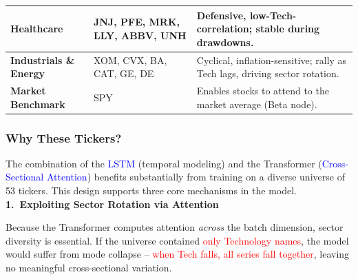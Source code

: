\documentclass[twoside,final]{hcmut-report}
\begin{document}
\begin{table}[H]
\begin{tabular}{p{3cm}|p{6cm}|p{7cm}}
    \textbf{Healthcare}
                                           & \parbox[t]{6cm}{\raggedright
      JNJ, PFE, MRK, LLY, ABBV, UNH
    }
                                           & \parbox[t]{7cm}{\raggedright
      Defensive, low-Tech-correlation; stable during drawdowns.
    }                                                                                                                                  \\
    \hline

    \textbf{Industrials \& Energy}
                                           & \parbox[t]{6cm}{\raggedright
      XOM, CVX, BA, CAT, GE, DE
    }
                                           & \parbox[t]{7cm}{\raggedright
      Cyclical, inflation-sensitive; rally as Tech lags, driving sector rotation.
    }                                                                                                                                  \\
    \hline

    \textbf{Market Benchmark}
                                           & \parbox[t]{6cm}{\raggedright
      SPY
    }
                                           & \parbox[t]{7cm}{\raggedright
      Enables stocks to attend to the market average (Beta node).
    }                                                                                                                                  \\
  \end{tabular}
\end{table}


\subsubsection*{Why These Tickers?}

The combination of the \textcolor{blue}{LSTM} (temporal modeling) and the Transformer (\textcolor{blue}{Cross-Sectional Attention}) benefits substantially from training on a diverse universe of 53 tickers. This design supports three core mechanisms in the model.\\

\textbf{1.~Exploiting Sector Rotation via Attention}

Because the Transformer computes attention \emph{across} the batch dimension, sector diversity is essential. If the universe contained \textcolor{red}{only Technology names}, the model would suffer from mode collapse -- \textcolor{red}{when Tech falls, all series fall together}, leaving no meaningful cross-sectional variation.\\
\end{document}
